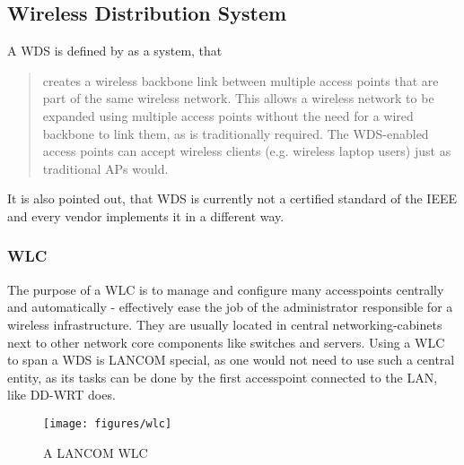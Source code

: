     \subsection{Wireless Distribution System}
      A \ac{WDS} is defined by \cite{dd_wrt} as a system, that
      
      \begin{quote}
	creates a wireless backbone link between multiple access points that are part of the same wireless network. 
	This allows a wireless network to be expanded using multiple access points without the need for a wired backbone to link them, as is traditionally required. 
	The WDS-enabled access points can accept wireless clients (e.g. wireless laptop users) just as traditional APs would.
      \end{quote}

      It is also pointed out, that WDS is currently not a certified standard of the IEEE and every vendor implements it in a different way.      
      
      \subsubsection{\ac{WLC}}
	The purpose of a \ac{WLC} is to manage and configure many accesspoints centrally and automatically - effectively ease the job of the administrator responsible for a 
	wireless infrastructure. They are usually located in central networking-cabinets next to other network core components like switches and servers.
	Using a WLC to span a WDS is LANCOM special, as one would not need to use such a central entity, as its tasks can be done by the first accesspoint connected to the LAN,
	like DD-WRT does.
	
	\begin{figure}[h!]
	  \centering
	  \texttt{[image: figures/wlc]}
	  \caption{A LANCOM \ac{WLC}}
	  \label{fig:wlc}
	\end{figure}
      

